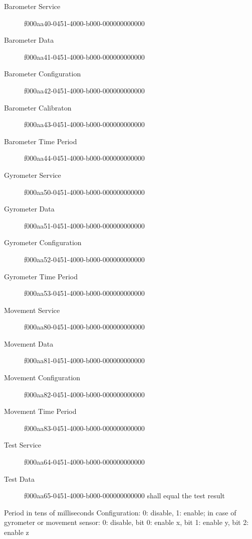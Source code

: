 \begin{description}
\begin{description}
     \item[Barometer Service] f000aa40-0451-4000-b000-000000000000
     \item[Barometer Data] f000aa41-0451-4000-b000-000000000000
     \item[Barometer Configuration] f000aa42-0451-4000-b000-000000000000
     \item[Barometer Calibraton] f000aa43-0451-4000-b000-000000000000
     \item[Barometer Time Period] f000aa44-0451-4000-b000-000000000000

     \item[Gyrometer Service] f000aa50-0451-4000-b000-000000000000
     \item[Gyrometer Data] f000aa51-0451-4000-b000-000000000000
     \item[Gyrometer Configuration] f000aa52-0451-4000-b000-000000000000
     \item[Gyrometer Time Period] f000aa53-0451-4000-b000-000000000000

     \item[Movement Service] f000aa80-0451-4000-b000-000000000000
     \item[Movement Data] f000aa81-0451-4000-b000-000000000000
     \item[Movement Configuration] f000aa82-0451-4000-b000-000000000000
     \item[Movement Time Period] f000aa83-0451-4000-b000-000000000000

     \item[Test Service] f000aa64-0451-4000-b000-000000000000
     \item[Test Data] f000aa65-0451-4000-b000-000000000000 shall equal the test result
   \end{description}
   Period in tens of milliseconds
   Configuration: 0: disable, 1: enable; in case of gyrometer or movement sensor: 0: disable, bit 0: enable x, bit 1: enable y, bit 2: enable z
\end{description}

